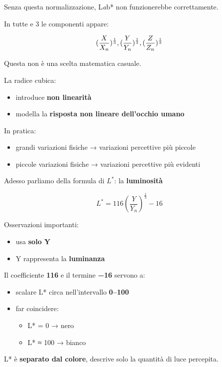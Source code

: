 \documentclass[
]{article}
\providecommand{\tightlist}{%
  \setlength{\itemsep}{0pt}\setlength{\parskip}{0pt}}
\begin{document}
Senza questa normalizzazione, L\emph{a}b* non funzionerebbe correttamente.

In tutte e 3 le componenti appare:

\[
(\frac{X}{X_n})^\frac{1}{3},\space (\frac{Y}{Y_n})^\frac{1}{3},\space
(\frac{Z}{Z_n})^\frac{1}{3}
\]

Questa non è una scelta matematica casuale.

La radice cubica:

\begin{itemize}
\tightlist
\item
  introduce \textbf{non linearità}
\item
  modella la \textbf{risposta non lineare dell'occhio umano}
\end{itemize}

In pratica:

\begin{itemize}
\tightlist
\item
  grandi variazioni fisiche → variazioni percettive più piccole
\item
  piccole variazioni fisiche → variazioni percettive più evidenti
\end{itemize}

Adesso parliamo della formula di \(L^*\): la \textbf{luminosità}

\[
L^* = 116 \left( \frac{Y}{Y_n} \right)^{\frac{1}{3}} - 16
\]

Osservazioni importanti:

\begin{itemize}
\tightlist
\item
  usa \textbf{solo Y}
\item
  Y rappresenta la \textbf{luminanza}
\end{itemize}

Il coefficiente \textbf{116} e il termine \textbf{−16} servono a:

\begin{itemize}
\tightlist
\item
  scalare L* circa nell'intervallo \textbf{0--100}
\item
  far coincidere:

  \begin{itemize}
  \tightlist
  \item
    L* = 0 → nero
  \item
    L* ≈ 100 → bianco
  \end{itemize}
\end{itemize}

L* è \textbf{separato dal colore}, descrive solo la quantità di luce percepita.
\end{document}
